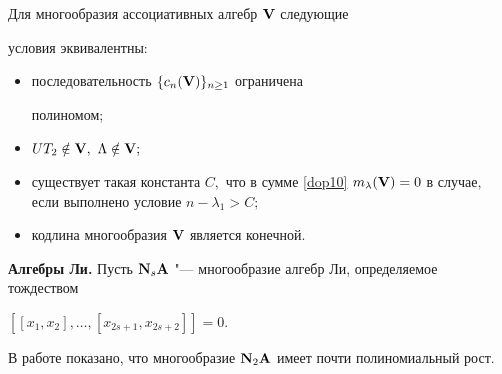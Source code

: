\begin{theorem} Для многообразия ассоциативных алгебр ${\bf V}$ следующие

условия эквивалентны\/{\rm:}

\begin{itemize}

\item[\rm (i)] последовательность $\{c_n({\bf V})\}_{n \geq 1}$ ограничена

полиномом\/{\rm ;}



\item[\rm (ii)] $UT_2 \notin {\bf V},$ $\Lambda \notin {\bf V};$



\item[\rm (iii)]  существует такая константа $C,$ что в сумме \eqref{dop10}  $m_\lambda({\bf V}) = 0$ в случае$,$ если выполнено условие $n - \lambda_1 > C;$



\item[\rm (iv)] кодлина многообразия ${\bf V}$ является конечной$.$



\end{itemize}



\end{theorem}








\smallskip



{\bf Алгебры Ли.} Пусть ${\bf N}_s{\bf A}$ "--- многообразие алгебр Ли, определяемое тождеством

$[[x_1,x_2], \dots ,[x_{2s+1},x_{2s+2}]]=0.$

В работе \cite{cherev:bib:M2} показано, что многообразие ${\bf N}_2{\bf A}$ имеет почти полиномиальный рост.



\smallskip



